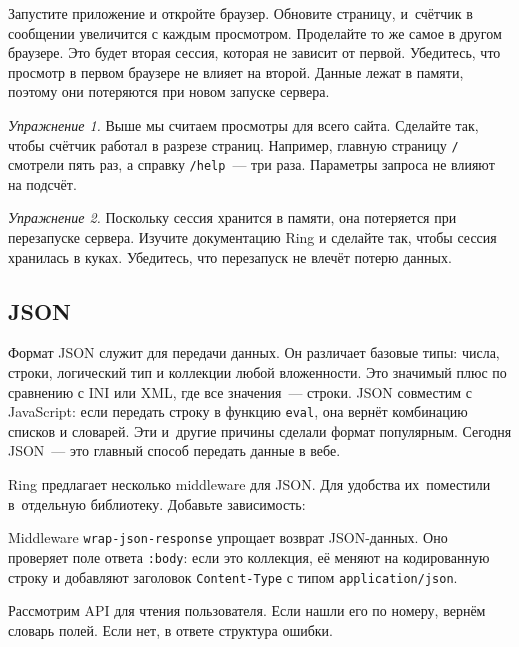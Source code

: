 Запустите приложение и откройте браузер. Обновите страницу, и~счётчик в
сообщении увеличится с каждым просмотром. Проделайте то же самое в другом
браузере. Это будет вторая сессия, которая не зависит от первой. Убедитесь, что
просмотр в первом браузере не влияет на второй. Данные лежат в памяти, поэтому
они потеряются при новом запуске сервера.

\emph{Упражнение 1.} Выше мы считаем просмотры для всего сайта. Сделайте так,
чтобы счётчик работал в разрезе страниц. Например, главную страницу \verb|/|
смотрели пять раз, а справку \verb|/help|~--- три раза. Параметры запроса не
влияют на подсчёт.

\emph{Упражнение 2.} Поскольку сессия хранится в памяти, она потеряется при
перезапуске сервера. Изучите документацию Ring и сделайте так, чтобы сессия
хранилась в куках. Убедитесь, что перезапуск не влечёт потерю данных.

\subsection{JSON}


Формат JSON служит для передачи данных. Он различает базовые типы: числа,
строки, логический тип и коллекции любой вложенности. Это значимый плюс по
сравнению с INI или XML, где все значения~--- строки. JSON совместим с JavaScript:
если передать строку в функцию \verb|eval|, она вернёт комбинацию списков
и словарей. Эти и~другие причины сделали формат популярным. Сегодня JSON~--- это
главный способ передать данные в вебе.

Ring предлагает несколько middleware для JSON. Для удобства их~поместили
в~отдельную библиотеку. Добавьте зависимость:

\begin{english}
  \begin{clojure}
  \end{clojure}
\end{english}


Middleware \verb|wrap-json-response| упрощает возврат JSON-данных. Оно проверяет
поле ответа \verb|:body|: если это коллекция, её меняют на кодированную строку и
добавляют заголовок \verb|Content-Type| с типом \verb|application/json|.

Рассмотрим API для чтения пользователя. Если нашли его по номеру, вернём
словарь полей. Если нет, в ответе структура ошибки.

